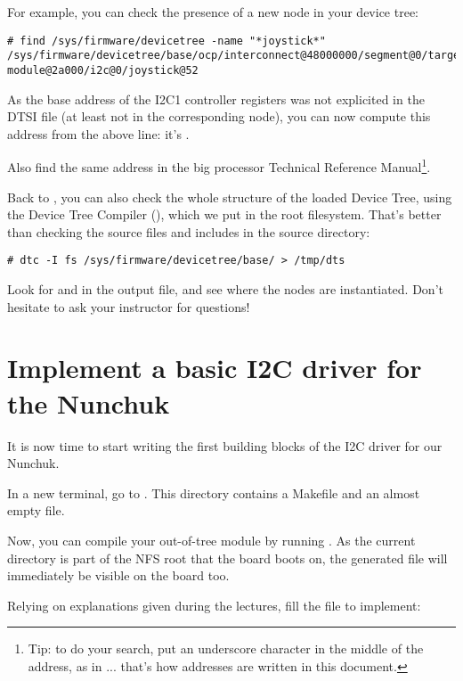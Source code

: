 For example, you can check the presence of a new  node in
your device tree:

{\small
\begin{verbatim}
# find /sys/firmware/devicetree -name "*joystick*"
/sys/firmware/devicetree/base/ocp/interconnect@48000000/segment@0/target-module@2a000/i2c@0/joystick@52
\end{verbatim}
}

As the base address of the I2C1 controller registers was not explicited
in the DTSI file (at least not in the corresponding node), you can now
compute this address from the above line: it's .

Also find the same address in the big processor Technical Reference
Manual\footnote{Tip: to do your search, put an underscore character
in the middle of the address, as in ... that's how
addresses are written in this document.}.

Back to , you can also check the whole
structure of the loaded Device Tree, using the Device Tree Compiler
(), which we put in the root filesystem. That's better than
checking the source files and includes in the source directory:

\begin{verbatim}
# dtc -I fs /sys/firmware/devicetree/base/ > /tmp/dts
\end{verbatim}

Look for  and  in the output file,
and see where the nodes are instantiated. Don't hesitate to ask your
instructor for questions!

\section{Implement a basic I2C driver for the Nunchuk}

It is now time to start writing the first building blocks of the I2C
driver for our Nunchuk.

In a new terminal, go to
.  This directory
contains a Makefile and an almost empty  file.

Now, you can compile your out-of-tree module by running . As
the current directory is part of the NFS root that the board boots on,
the generated  file will immediately be visible on the board
too.

Relying on explanations given during the lectures, fill the
 file to implement:

